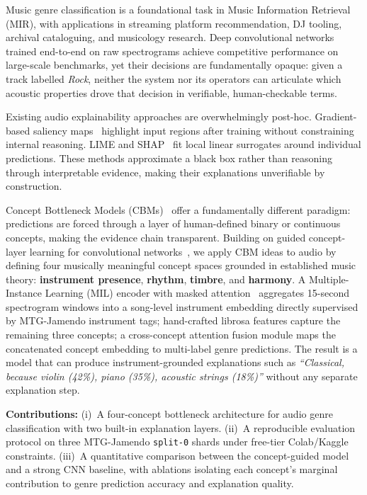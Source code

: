 \documentclass[sigconf,nonacm]{acmart}
\begin{document}
Music genre classification is a foundational task in Music Information Retrieval (MIR),
with applications in streaming platform recommendation, DJ tooling, archival cataloguing, and
musicology research. Deep convolutional networks trained end-to-end on raw spectrograms achieve
competitive performance on large-scale benchmarks, yet their decisions are fundamentally opaque:
given a track labelled \textit{Rock}, neither the system nor its operators can articulate which
acoustic properties drove that decision in verifiable, human-checkable terms.

Existing audio explainability approaches are overwhelmingly post-hoc. Gradient-based saliency
maps~\cite{simonyan2014saliency} highlight input regions after training without constraining
internal reasoning. LIME and SHAP~\cite{ribeiro2016lime} fit local linear surrogates around
individual predictions. These methods approximate a black box rather than reasoning through
interpretable evidence, making their explanations unverifiable by construction.

Concept Bottleneck Models (CBMs)~\cite{koh2020concept} offer a fundamentally different paradigm:
predictions are forced through a layer of human-defined binary or continuous concepts, making the
evidence chain transparent. Building on guided concept-layer learning for convolutional
networks~\cite{wickramanayake2021comprehensible}, we apply CBM ideas to audio by defining four
musically meaningful concept spaces grounded in established music theory:
\textbf{instrument presence}, \textbf{rhythm}, \textbf{timbre}, and \textbf{harmony}.
A Multiple-Instance Learning (MIL) encoder with masked attention~\cite{ilse2018mil}
aggregates 15-second spectrogram windows into a song-level instrument embedding directly
supervised by MTG-Jamendo instrument tags; hand-crafted librosa features capture the remaining
three concepts; a cross-concept attention fusion module maps the concatenated concept embedding
to multi-label genre predictions. The result is a model that can produce instrument-grounded
explanations such as \emph{``Classical, because violin (42\%), piano (35\%), acoustic strings
(18\%)''} without any separate explanation step.

\textbf{Contributions:}
(i)~A four-concept bottleneck architecture for audio genre classification with two built-in
explanation layers.
(ii)~A reproducible evaluation protocol on three MTG-Jamendo \texttt{split-0} shards under
free-tier Colab/Kaggle constraints.
(iii)~A quantitative comparison between the concept-guided model and a strong CNN baseline,
with ablations isolating each concept's marginal contribution to genre prediction accuracy
and explanation quality.
\end{document}
